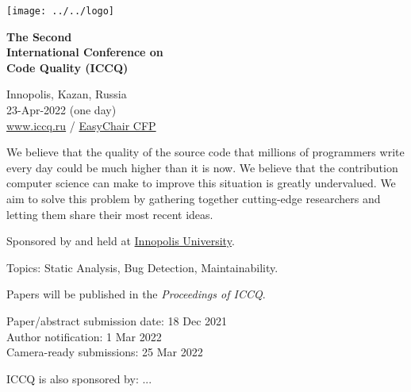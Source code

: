 \documentclass[12pt,oneside]{article}
\begin{document}
\selectfont
\raggedbottom
\raggedright
\setlength{\topskip}{6pt}
\setlength{\parindent}{0pt} %
\setlength{\parskip}{6pt} %

\begin{table}%
  \raggedleft%
  \texttt{[image: ../../logo]}
\end{table}

\textcolor{xred}{\bfseries
{\large The Second} \\
{\Large International Conference on\\[3pt]
Code Quality (ICCQ)}}


\vspace{6pt}

Innopolis, Kazan, Russia \\
23-Apr-2022 (one day) \\
\href{https://www.iccq.ru}{www.iccq.ru} / \href{https://easychair.org/cfp/ICCQ22}{EasyChair CFP}\\

\vspace{12pt}

\newcommand\person[2]{
  \begin{minipage}[t]{0.22\textwidth}\raggedright%
  \texttt{[image: ../../images/\#1]} \\
  {\small #2}%
  \end{minipage}
}

\vspace{6pt}

We believe that the quality of the source code that millions of programmers
write every day could be much higher than it is now. We believe that the
contribution computer science can make to improve this situation is greatly
undervalued. We aim to solve this problem by gathering
together cutting-edge researchers and letting them share their most recent ideas.

Sponsored by and held at \href{https://innopolis.university/en/}{Innopolis University}.

Topics: Static Analysis, Bug Detection, Maintainability.

Papers will be published in the \textit{Proceedings of ICCQ}.

\vspace{6pt}

Paper/abstract submission date: 18 Dec 2021 \\
Author notification: 1 Mar 2022 \\
Camera-ready submissions: 25 Mar 2022

\vspace{6pt}

\begin{adjustwidth}{0pt}{1in}
ICCQ is also sponsored by: ...
\end{adjustwidth}
\end{document}
